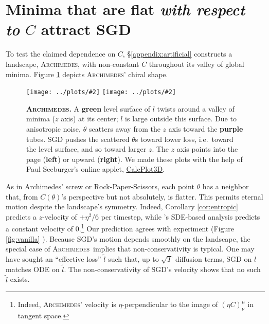 \documentclass[openany, notitlepage, justified]{tufte-book}
\newcommand{\ofsix}[1]{
    {\tiny \raisebox{0.04cm}{$\substack{
        \ifthenelse{\equal{#1}{0}}{{\color{moor}\blacksquare}}{\square}
        \ifthenelse{\equal{#1}{2}}{{\color{moor}\blacksquare}}{\square}    
        \ifthenelse{\equal{#1}{4}}{{\color{moor}\blacksquare}}{\square} \\
        \ifthenelse{\equal{#1}{1}}{{\color{moor}\blacksquare}}{\square}    
        \ifthenelse{\equal{#1}{3}}{{\color{moor}\blacksquare}}{\square}
        \ifthenelse{\equal{#1}{5}}{{\color{moor}\blacksquare}}{\square}
    }$}}%
}
\theoremstyle{plain}
\theoremstyle{definition}
\newcommand{\pmoo}[2]{\texttt{[image: ../plots/\#2]}}
\newcommand{\Archimedes}{\textsc{Archimedes}}
\begin{document}
    \section{Minima that are flat \emph{with respect to} $C$ attract SGD}
        \label{subsect:entropic}
        To test the claimed dependence on $C$, \S\ref{appendix:artificial}
        constructs a landscape, \Archimedes, with non-constant $C$ throughout
        its valley of global minima.  Figure \ref{fig:archimedes} 
        depicts \Archimedes' chiral shape.
        \begin{figure}
            \centering
            \pmoo{3cm}{from-above}
            \pmoo{3cm}{from-side}
            \caption{
                \textbf{\Archimedes.}
                A \textbf{green} level surface of $l$ twists around a valley of
                minima ($z$ axis) at its center; $l$ is large outside this
                surface.  Due to anisotropic noise, $\theta$ scatters away
                from the $z$ axis toward the \textbf{purple} tubes.
                SGD pushes the scattered $\theta$s toward lower loss, i.e.\
                toward the level surface, and so toward larger $z$.
                The $z$ axis points into the page (\textbf{left}) or upward
                (\textbf{right}).
                We made these plots with
                the help of Paul Seeburger's online applet,
                \href{https://www.monroecc.edu/faculty/paulseeburger/calcnsf/CalcPlot3D/}{CalcPlot3D}.
            }
            \label{fig:archimedes}
        \end{figure}
        As in
        Archimedes' screw or Rock-Paper-Scissors, each point $\theta$ has a
        neighbor that, from $C(\theta)$'s perspective but not absolutely, is
        flatter.  This permits eternal motion despite the landscape's symmetry.
        Indeed, Corollary \ref{cor:entropic} predicts 
        a $z$-velocity of $+\eta^2/6$ per timestep, while \citep{ch18}'s
        SDE-based analysis predicts a constant velocity of $0$.\footnote{
            Indeed, \Archimedes' velocity is $\eta$-perpendicular to the image
            of $(\eta C)^\mu_\nu$ in tangent space.
        }
        Our prediction agrees with experiment (Figure
        \ref{fig:vanilla}\ofsix{4}).
        Because SGD's motion depends smoothly on the landscape, the special
        case of \Archimedes\ implies that non-conservativity is typical.
        One may have sought an ``effective loss'' $\tilde{l}$ such that, up to
        $\sqrt{T}$ diffusion terms, SGD on $l$ matches ODE on $\tilde{l}$.  The
        non-conservativity of SGD's velocity shows that no such $\tilde{l}$
        exists.
\end{document}
